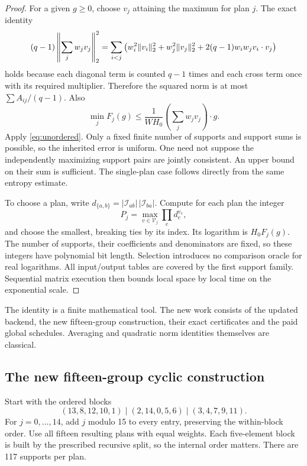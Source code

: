 \begin{proof}
For a given $g\ge0$, choose $v_j$ attaining the maximum for plan $j$.
The exact identity
\[
 (q-1)\left\|\sum_jw_jv_j\right\|_2^2
 =\sum_{i<j}\left(w_i^2\lVert v_i\rVert_2^2+w_j^2\lVert v_j\rVert_2^2
                   +2(q-1)w_iw_jv_i\cdot v_j\right)
\]
holds because each diagonal term is counted $q-1$ times and each cross
term once with its required multiplier. Therefore the squared norm is
at most $\sum A_{ij}/(q-1)$. Also
\[
 \min_jF_j(g)\le\frac1{WH_0}\left(\sum_jw_jv_j\right)\cdot g.
\]
Apply \eqref{eq:unordered}. Only a fixed finite number of supports and
support sums is possible, so the inherited error is uniform. One need
not suppose the independently maximizing support pairs are jointly
consistent. An upper bound on their sum is sufficient. The single-plan
case follows directly from the same entropy estimate.

To choose a plan, write $d_{\{a,b\}}=|\mathcal I_{ab}|\,|\mathcal I_{ba}|$.
Compute for each plan the integer
\[
 P_j=\max_{v\in\mathcal V_j}\prod_e d_e^{v_e},
\]
and choose the smallest, breaking ties by its index. Its logarithm is
$H_0F_j(g)$. The number of supports, their coefficients and denominators
are fixed, so these integers have polynomial bit length. Selection
introduces no comparison oracle for real logarithms. All input/output
tables are covered by the first support family. Sequential matrix
execution then bounds local space by local time on the exponential scale.
\end{proof}

The identity is a finite mathematical tool. The new work consists of the
updated backend, the new fifteen-group construction, their exact
certificates and the paid global schedules. Averaging and quadratic
norm identities themselves are classical.

\subsection{The new fifteen-group cyclic construction}

Start with the ordered blocks
\begin{equation}\label{eq:15seed}
 (13,8,12,10,1)\mid(2,14,0,5,6)\mid(3,4,7,9,11).
\end{equation}
For $j=0,\ldots,14$, add $j$ modulo 15 to every entry, preserving the
within-block order. Use all fifteen resulting plans with equal weights.
Each five-element block is built by the prescribed recursive split, so
the internal order matters. There are 117 supports per plan.


